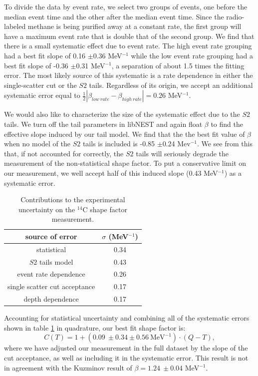 To divide the data by event rate, we select two groups of events, one before the median event time and the other after the median event time. Since the radio-labeled methane is being purified away at a constant rate, the first group will have a maximum event rate that is double that of the second group. We find that there is a small systematic effect due to event rate. The high event rate grouping had a best fit slope of 0.16 $\pm$0.36 MeV$^{-1}$ while the low event rate grouping had a best fit slope of -0.36 $\pm$0.31 MeV$^{-1}$, a separation of about 1.5 times the fitting error. The most likely source of this systematic is a rate dependence in either the single-scatter cut or the $S2$ tails. Regardless of its origin, we accept an additional systematic error equal to $\frac{1}{2}|\beta_{low \ rate}-\beta_{high \ rate}|=0.26$ MeV$^{-1}$. 

We would also like to characterize the size of the systematic effect due to the $S2$ tails. We turn off the tail parameters in libNEST and again float $\beta$ to find the effective slope induced by our tail model. We find that the the best fit value of $\beta$ when no model of the $S2$ tails is included is -0.85 $\pm$0.24 Mev$^{-1}$. We see from this that, if not accounted for correctly, the $S2$ tails will seriously degrade the measurement of the non-statistical shape factor. To put a conservative limit on our measurement, we well accept half of this induced slope (0.43 MeV$^{-1}$) as a systematic error.
\begin{table}
\centering
\begin{tabular}{c | c }
\hline
source of error & $\sigma$ (MeV$^{-1}$)\\
\hline\hline
statistical & 0.34 \\
$S2$ tails model & 0.43 \\
event rate dependence & 0.26 \\
single scatter cut acceptance & 0.17 \\
depth dependence & 0.17\\
\hline
\end{tabular}
\caption{Contributions to the experimental uncertainty on the $^{14}$C shape factor measurement.}
\label{tab:shape_errors}
\end{table}

Accounting for statistical uncertainty and combining all of the systematic errors shown in table \ref{tab:shape_errors} in quadrature, our best fit shape factor is:
\begin{equation}
C(T)=1+(0.09 \ \pm0.34 \pm0.56 \ \text{MeV}^{-1})\cdot(Q-T),
\end{equation}
where we have adjusted our measurement in the full dataset by the slope of the cut acceptance, as well as including it in the systematic error. This result is not in agreement with the Kuzminov result of $\beta=1.24 \ \pm0.04$ MeV$^{-1}$. 

